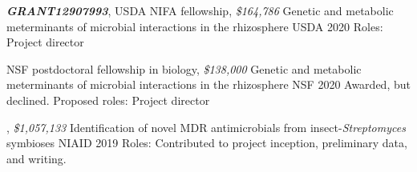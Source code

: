 

\begin{cventries}

\cventry
{\textbf{\textit{GRANT12907993}}, USDA NIFA fellowship, \textit{\$164,786}}
{Genetic and metabolic meterminants of microbial interactions in the rhizosphere}
{USDA}
{2020}
{Roles: Project director}

\cventry
{NSF postdoctoral fellowship in biology, \textit{\$138,000}}
{Genetic and metabolic meterminants of microbial interactions in the rhizosphere}
{NSF}
{2020}
{Awarded, but declined. Proposed roles: Project director}

\cventry
{\textbf{\textit{}}, \textit{\$1,057,133}}
{Identification of novel MDR antimicrobials from insect-\textit{Streptomyces} symbioses}
{NIAID}
{2019}
{Roles: Contributed to project inception, preliminary data, and writing.}

\end{cventries}

